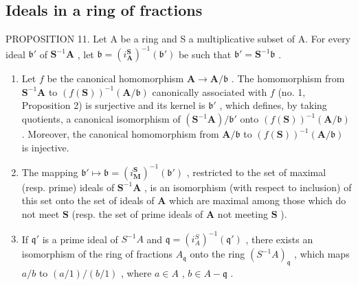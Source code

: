\subsection{Ideals in a ring of fractions}

PROPOSITION 11. Let A be a ring and S a multiplicative subset of A. For every ideal \(\mathfrak{b}'\) of \(\mathbf{S}^{-1}\mathbf{A}\) , let \(\mathfrak{b} = (i_{\mathbf{A}}^{\mathbf{S}})^{-1}(\mathfrak{b}')\) be such that \(\mathfrak{b}' = \mathbf{S}^{-1}\mathfrak{b}\) .

\begin{enumerate}
\def\labelenumi{(\roman{enumi})}
\item
  Let \(f\) be the canonical homomorphism \(\mathbf{A} \to \mathbf{A} / \mathfrak{b}\) . The homomorphism from \(\mathbf{S}^{-1}\mathbf{A}\) to \((f(\mathbf{S}))^{-1}(\mathbf{A} / \mathfrak{b})\) canonically associated with \(f\) (no. 1, Proposition 2) is surjective and its kernel is \(\mathfrak{b}'\) , which defines, by taking quotients, a canonical isomorphism of \((\mathbf{S}^{-1}\mathbf{A}) / \mathfrak{b}'\) onto \((f(\mathbf{S}))^{-1}(\mathbf{A} / \mathfrak{b})\) . Moreover, the canonical homomorphism from \(\mathbf{A} / \mathfrak{b}\) to \((f(\mathbf{S}))^{-1}(\mathbf{A} / \mathfrak{b})\) is injective.
\item
  The mapping \(\mathfrak{b}' \mapsto \mathfrak{b} = (i_{\mathbf{M}}^{\mathbf{S}})^{-1}(\mathfrak{b}')\) , restricted to the set of maximal (resp. prime) ideals of \(\mathbf{S}^{-1}\mathbf{A}\) , is an isomorphism (with respect to inclusion) of this set onto the set of ideals of \(\mathbf{A}\) which are maximal among those which do not meet \(\mathbf{S}\) (resp. the set of prime ideals of \(\mathbf{A}\) not meeting \(\mathbf{S}\) ).
\item
  If \(\mathfrak{q}'\) is a prime ideal of \(S^{-1}A\) and \(\mathfrak{q} = (i_A^S)^{-1}(\mathfrak{q}')\) , there exists an isomorphism of the ring of fractions \(A_{\mathfrak{q}}\) onto the ring \((S^{-1}A)_{\mathfrak{q}}\) , which maps \(a/b\) to \((a/1)/(b/1)\) , where \(a \in A\) , \(b \in A - \mathfrak{q}\) .

\end{enumerate}

